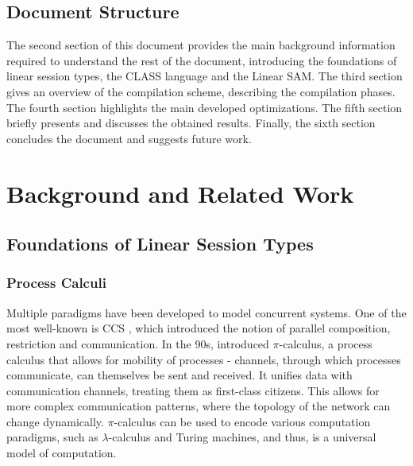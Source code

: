 \documentclass[sigconf,nonacm,natbib=true]{acmart}
\begin{document}
\subsection{Document Structure}

The second section of this document provides the main background information required to understand the rest of the document, introducing the foundations of linear session types, the \ac{CLASS} language and the Linear \ac{SAM}. The third section gives an overview of the compilation scheme, describing the compilation phases. The fourth section highlights the main developed optimizations. The fifth section briefly presents and discusses the obtained results. Finally, the sixth section concludes the document and suggests future work.

\section{Background and Related Work}

\subsection{Foundations of Linear Session Types}

\subsubsection{Process Calculi}

Multiple paradigms have been developed to model concurrent systems. One of the most well-known is \acf{CCS} \citep{Milner:1980}, which introduced the notion of parallel composition, restriction and communication. In the 90s, \citet{Milner:1992:1,Milner:1992:2} introduced $\pi$-calculus, a process calculus that allows for mobility of processes - channels, through which processes communicate, can themselves be sent and received. It unifies data with communication channels, treating them as first-class citizens. This allows for more complex communication patterns, where the topology of the network can change dynamically. $\pi$-calculus can be used to encode various computation paradigms, such as $\lambda$-calculus and Turing machines, and thus, is a universal model of computation.

\end{document}
